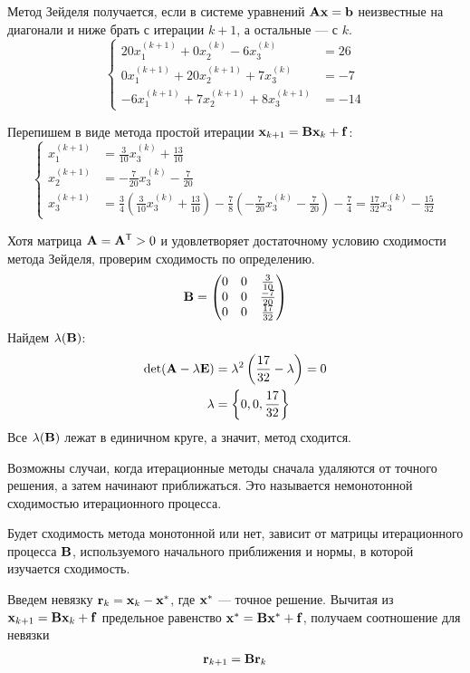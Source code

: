 \documentclass[professionalfonts,compress,unicode]{beamer}
\begin{document}
{
	Метод Зейделя получается, если в системе уравнений ${\bf A}{\bf x} = {\bf b}$ 
	неизвестные на диагонали и ниже брать с итерации $k+1$, 
	а остальные --- с $k$.
	\begin{equation*}
	\begin{cases}
	20x_1^{(k+1)} + 0x_2^{(k)}  -6 x_3^{(k)} &= 26\\
	0x_1^{(k+1)} + 20x_2^{(k+1)} + 7x_3^{(k)}  &= -7\\
	-6x_1^{(k+1)} + 7x_2^{(k+1)} + 8x_3^{(k+1)} &= -14 
	\end{cases}
	\end{equation*}

	Перепишем в виде метода простой итерации ${\bf x}_{k+1} = {\bf B} {\bf x}_k + {\bf f}$:
	\begin{equation*}
	\begin{cases}
	x_1^{(k+1)} &= \frac{3}{10} x_3^{(k)} + \frac{13}{10}\\
	x_2^{(k+1)} &= -\frac{7}{20} x_3^{(k)} - \frac{7}{20}\\
	x_3^{(k+1)} &= \frac{3}{4} 
	\left(\frac{3}{10} x_3^{(k)} + \frac{13}{10}\right) 
	-\frac{7}{8} \left(-\frac{7}{20} x_3^{(k)} - \frac{7}{20}\right)-\frac{7}{4}
    = \frac{17}{32} x_3^{(k)} - \frac{15}{32}
	\end{cases}
	\end{equation*}
}

{
	Хотя матрица ${\bf A} = {\bf A}^\mathsf{T} > 0$ и удовлетворяет достаточному условию 
	сходимости метода Зейделя, проверим сходимость по определению.
    \begin{equation*}
    {\bf B} = \begin{pmatrix}
    0 & 0 & \frac{3}{10} \\
    0 & 0 & \frac{-7}{20} \\
    0 & 0 & \frac{17}{32}
    \end{pmatrix}
    \end{equation*}
    Найдем $\lambda({\bf B})$:
    \begin{align*}
    \operatorname{det} ({\bf A} - \lambda {\bf E}) &= 
    \lambda^2 \left(\frac{17}{32} - \lambda \right) = 0\\
    \lambda &= \left\{ 0, 0, \frac{17}{32}\right\}
    \end{align*}
    Все $\lambda({\bf B})$ лежат в единичном круге, а значит, метод сходится.
}

{
	Возможны случаи, когда итерационные методы сначала удаляются от точного решения, а затем
	начинают приближаться. Это называется немонотонной сходимостью итерационного процесса. 

	Будет сходимость метода монотонной или нет, зависит от матрицы итерационного процесса ${\bf B}$, 
	используемого начального приближения и нормы, в которой изучается сходимость.

    Введем невязку ${\bf r}_k = {\bf x}_k - {\bf x}^*$, где ${\bf x}^*$ --- точное решение. Вычитая
    из ${\bf x}_{k+1} = {\bf B} {\bf x}_k + {\bf f}$ предельное равенство ${\bf x}^* = {\bf B} {\bf x}^* + {\bf f}$,
    получаем соотношение для невязки
    \begin{equation*}
        {\bf r}_{k+1} = {\bf B} {\bf r}_k
    \end{equation*}
}
\end{document}
